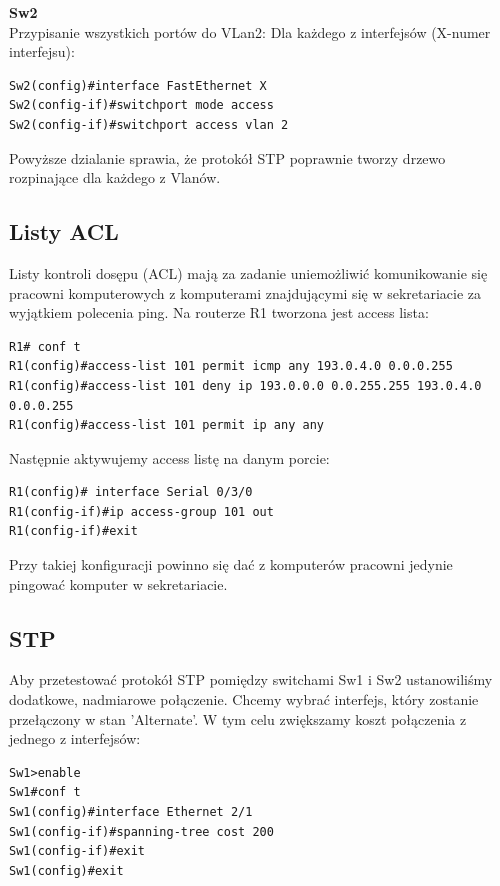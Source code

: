 \documentclass[11pt,a4paper]{article}
\begin{document}
\noindent
{\bf Sw2}\\
Przypisanie wszystkich portów do VLan2:
Dla każdego z interfejsów (X-numer interfejsu):
\begin{lstlisting}
Sw2(config)#interface FastEthernet X
Sw2(config-if)#switchport mode access
Sw2(config-if)#switchport access vlan 2
\end{lstlisting}
Powyższe dzialanie sprawia, że protokół STP poprawnie tworzy drzewo rozpinające dla każdego z Vlanów.

\subsection{Listy ACL}
Listy kontroli dosępu (ACL) mają za zadanie uniemożliwić komunikowanie się pracowni komputerowych z komputerami znajdującymi się w sekretariacie za wyjątkiem polecenia ping. Na routerze R1 tworzona jest access lista:
\begin{lstlisting}
R1# conf t
R1(config)#access-list 101 permit icmp any 193.0.4.0 0.0.0.255 
R1(config)#access-list 101 deny ip 193.0.0.0 0.0.255.255 193.0.4.0 0.0.0.255
R1(config)#access-list 101 permit ip any any
\end{lstlisting}
Następnie aktywujemy access listę na danym porcie:
\begin{lstlisting}
R1(config)# interface Serial 0/3/0
R1(config-if)#ip access-group 101 out	
R1(config-if)#exit 
\end{lstlisting}
Przy takiej konfiguracji powinno się dać z komputerów pracowni jedynie pingować komputer w sekretariacie.

\subsection{STP}
Aby przetestować protokół STP pomiędzy switchami Sw1 i Sw2 ustanowiliśmy dodatkowe, nadmiarowe połączenie. Chcemy wybrać interfejs, który zostanie przełączony w stan 'Alternate'. W tym celu zwiększamy koszt połączenia z jednego z interfejsów:
\begin{lstlisting}
Sw1>enable
Sw1#conf t
Sw1(config)#interface Ethernet 2/1
Sw1(config-if)#spanning-tree cost 200
Sw1(config-if)#exit
Sw1(config)#exit
\end{lstlisting}

\end{document}
